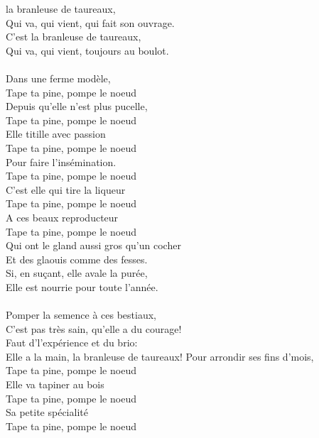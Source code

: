 %
 la branleuse de taureaux,
\\Qui va, qui vient, qui fait son ouvrage.
\\C'est la branleuse de taureaux,
\\Qui va, qui vient, toujours au boulot.
\\\\Dans une ferme modèle, 
\\ Tape ta pine, pompe le noeud
\\Depuis qu'elle n'est plus pucelle, 
\\ Tape ta pine, pompe le noeud
\\Elle titille avec passion
\\ Tape ta pine, pompe le noeud
\\Pour faire l'insémination. 
\\ Tape ta pine, pompe le noeud
\\C'est elle qui tire la liqueur
\\ Tape ta pine, pompe le noeud
\\A ces beaux reproducteur
\\ Tape ta pine, pompe le noeud
\\Qui ont le gland aussi gros qu'un cocher
\\Et des glaouis comme des fesses.
\\Si, en suçant, elle avale la purée,
\\Elle est nourrie pour toute l'année.
\\\\Pomper la semence à ces  bestiaux,
\\C'est pas très sain, qu'elle a du courage!
\\Faut d'l'expérience et du brio:
\\Elle a la main, la branleuse de taureaux!
\breakpage
Pour arrondir ses fins d'mois, 
\\ Tape ta pine, pompe le noeud
\\Elle va tapiner au bois 
\\ Tape ta pine, pompe le noeud
\\Sa petite spécialité 
\\ Tape ta pine, pompe le noeud
